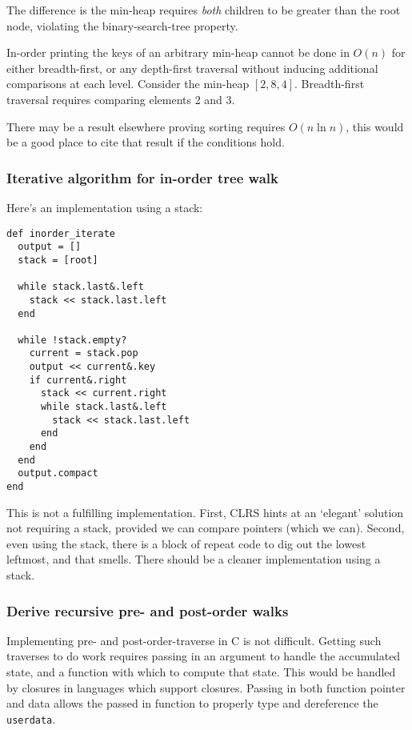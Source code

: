\documentclass{article}
\begin{document}
The difference is the min-heap requires \emph{both} children to be
greater than the root node, violating the binary-search-tree property.

In-order printing the keys of an arbitrary min-heap cannot be done in $O(n)$
for either breadth-first, or any depth-first traversal without inducing
additional comparisons at each level. Consider the min-heap $[2, 8, 4]$.
Breadth-first traversal requires comparing elements 2 and 3.

There may be a result elsewhere proving sorting requires $O(n\ln n)$,
this would be a good place to cite that result if the conditions hold.

\subsubsection{Iterative algorithm for in-order tree walk}

Here's an implementation using a stack:

\begin{lstlisting}[frame=single,title=Iterative inorder traverse]
def inorder_iterate
  output = []
  stack = [root]

  while stack.last&.left
    stack << stack.last.left
  end

  while !stack.empty?
    current = stack.pop
    output << current&.key
    if current&.right
      stack << current.right
      while stack.last&.left
        stack << stack.last.left
      end
    end
  end
  output.compact
end
\end{lstlisting}

This is not a fulfilling implementation. First, CLRS hints at an
`elegant' solution not requiring a stack, provided we can compare pointers
(which we can). Second, even using the stack, there is a block of
repeat code to dig out the lowest leftmost, and that smells. There should
be a cleaner implementation using a stack.


\subsubsection{Derive recursive pre- and post-order walks}

Implementing pre- and post-order-traverse in C is not difficult. Getting
such traverses to do work requires passing in an argument to handle
the accumulated state, and a function with which to compute that state.
This would be handled by closures in languages which support closures.
Passing in both function pointer and data allows the passed in function
to properly type and dereference the \texttt{userdata}.
\end{document}
